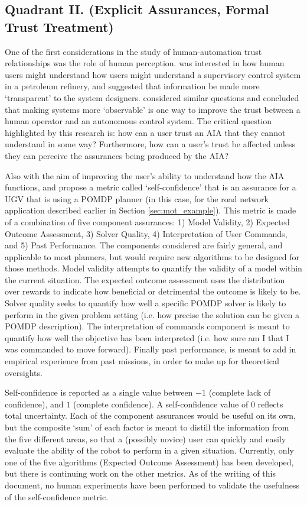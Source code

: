 \subsection{Quadrant II. (Explicit Assurances, Formal Trust Treatment)}\label{sec:q2}
One of the first considerations in the study of human-automation trust relationships was the role of human perception. \citet{Sheridan1984-kx} was interested in how human users might understand how users might understand a supervisory control system in a petroleum refinery, and suggested that information be made more `transparent' to the system designers. \citet{Muir1987-mk,Muir1994-ow} considered similar questions and concluded that making systems more `observable' is one way to improve the trust between a human operator and an autonomous control system. The critical question highlighted by this research is: how can a user trust an AIA that they cannot understand in some way? Furthermore, how can a user's trust be affected unless they can perceive the assurances being produced by the AIA?

Also with the aim of improving the user's ability to understand how the AIA functions, \citet{Aitken2016-fb} and \citet{Aitken2016-cv} propose a metric called `self-confidence' that is an assurance for a UGV that is using a POMDP planner (in this case, for the road network application described earlier in Section \ref{sec:mot_example}). This metric is made of a combination of five component assurances: 1) Model Validity, 2) Expected Outcome Assessment, 3) Solver Quality, 4) Interpretation of User Commands, and 5) Past Performance. The components considered are fairly general, and applicable to most planners, but would require new algorithms to be designed for those methods. Model validity attempts to quantify the validity of a model within the current situation. The expected outcome assessment uses the distribution over rewards to indicate how beneficial or detrimental the outcome is likely to be. Solver quality seeks to quantify how well a specific POMDP solver is likely to perform in the given problem setting (i.e. how precise the solution can be given a POMDP description). The interpretation of commands component is meant to quantify how well the objective has been interpreted (i.e. how sure am I that I was commanded to move forward). Finally past performance, is meant to add in empirical experience from past missions, in order to make up for theoretical oversights.

Self-confidence is reported as a single value between $-1$ (complete lack of confidence), and $1$ (complete confidence). A self-confidence value of $0$ reflects total uncertainty. Each of the component assurances would be useful on its own, but the composite `sum' of each factor is meant to distill the information from the five different areas, so that a (possibly novice) user can quickly and easily evaluate the ability of the robot to perform in a given situation. Currently, only one of the five algorithms (Expected Outcome Assessment) has been developed, but there is continuing work on the other metrics. As of the writing of this document, no human experiments have been performed to validate the usefulness of the self-confidence metric. 

